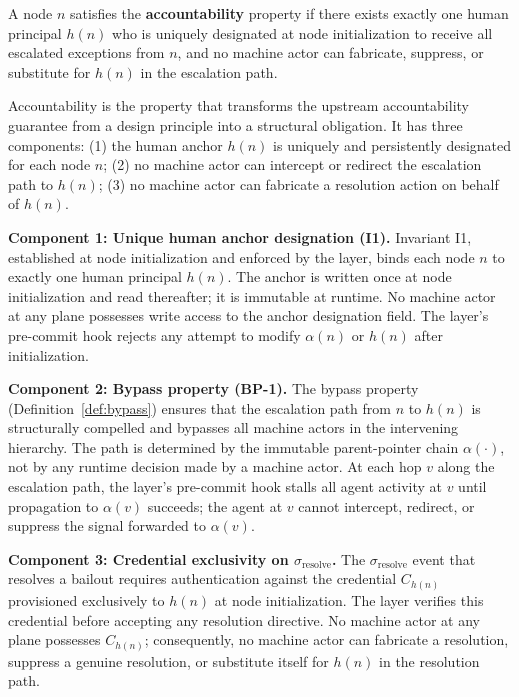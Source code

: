 \begin{definition}[Accountability]
A node $n$ satisfies the \textbf{accountability} property if there exists exactly one human principal $h(n)$ who is uniquely designated at node initialization to receive all escalated exceptions from $n$, and no machine actor can fabricate, suppress, or substitute for $h(n)$ in the escalation path.
\end{definition}

Accountability is the property that transforms the upstream accountability guarantee from a design principle into a structural obligation. It has three components: (1) the human anchor $h(n)$ is uniquely and persistently designated for each node $n$; (2) no machine actor can intercept or redirect the escalation path to $h(n)$; (3) no machine actor can fabricate a resolution action on behalf of $h(n)$.

\textbf{Component 1: Unique human anchor designation (I1).} Invariant I1, established at node initialization and enforced by the \fact{} layer, binds each node $n$ to exactly one human principal $h(n)$. The anchor is written once at node initialization and read thereafter; it is immutable at runtime. No machine actor at any plane possesses write access to the anchor designation field. The \fact{} layer's pre-commit hook rejects any attempt to modify $\alpha(n)$ or $h(n)$ after initialization.

\textbf{Component 2: Bypass property (BP-1).} The bypass property (Definition~\ref{def:bypass}) ensures that the escalation path from $n$ to $h(n)$ is structurally compelled and bypasses all machine actors in the intervening hierarchy. The path is determined by the immutable parent-pointer chain $\alpha(\cdot)$, not by any runtime decision made by a machine actor. At each hop $v$ along the escalation path, the \fact{} layer's pre-commit hook stalls all agent activity at $v$ until propagation to $\alpha(v)$ succeeds; the agent at $v$ cannot intercept, redirect, or suppress the signal forwarded to $\alpha(v)$.

\textbf{Component 3: Credential exclusivity on $\sigma_{\text{resolve}}$.} The $\sigma_{\text{resolve}}$ event that resolves a bailout requires authentication against the credential $C_{h(n)}$ provisioned exclusively to $h(n)$ at node initialization. The \fact{} layer verifies this credential before accepting any resolution directive. No machine actor at any plane possesses $C_{h(n)}$; consequently, no machine actor can fabricate a resolution, suppress a genuine resolution, or substitute itself for $h(n)$ in the resolution path.

